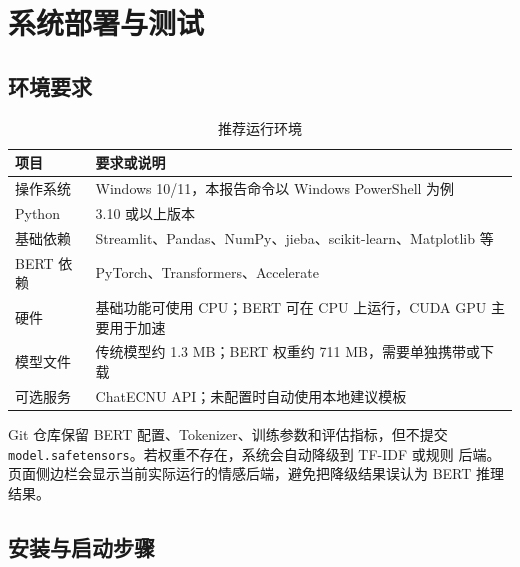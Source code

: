 \section{系统部署与测试}

\subsection{环境要求}

\begin{table}[H]
  \centering
  \caption{推荐运行环境}
  \label{tab:environment}
  \small
  \begin{tabularx}{0.9\textwidth}{L{3.2cm} Y}
    \toprule
    项目 & 要求或说明 \\
    \midrule
    操作系统 & Windows 10/11，本报告命令以 Windows PowerShell 为例 \\
    Python & 3.10 或以上版本 \\
    基础依赖 & Streamlit、Pandas、NumPy、jieba、scikit-learn、Matplotlib 等 \\
    BERT 依赖 & PyTorch、Transformers、Accelerate \\
    硬件 & 基础功能可使用 CPU；BERT 可在 CPU 上运行，CUDA GPU 主要用于加速 \\
    模型文件 & 传统模型约 1.3 MB；BERT 权重约 711 MB，需要单独携带或下载 \\
    可选服务 & ChatECNU API；未配置时自动使用本地建议模板 \\
    \bottomrule
  \end{tabularx}
\end{table}

Git 仓库保留 BERT 配置、Tokenizer、训练参数和评估指标，但不提交
\mbox{\texttt{model.safetensors}}。若权重不存在，系统会自动降级到 TF-IDF 或规则
后端。页面侧边栏会显示当前实际运行的情感后端，避免把降级结果误认为 BERT 推理结果。

\subsection{安装与启动步骤}

